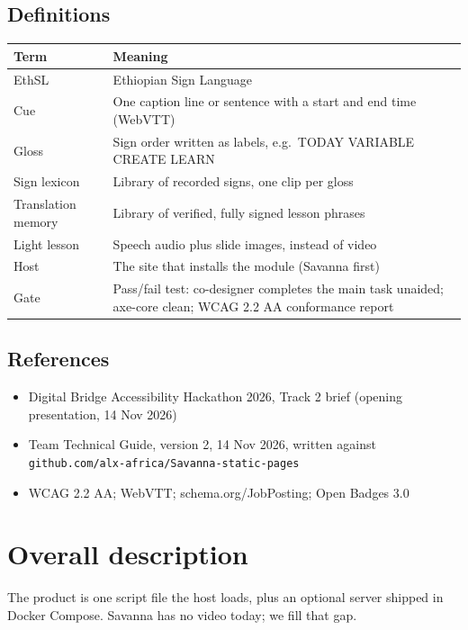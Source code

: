 \documentclass[11pt,a4paper]{article}
\newcommand{\code}[1]{\texttt{#1}}
\begin{document}
\subsection{Definitions}
\begin{xltabular}{\textwidth}{@{}l X@{}}
\toprule
\textbf{Term} & \textbf{Meaning} \\
\midrule
\endhead
EthSL & Ethiopian Sign Language \\
Cue & One caption line or sentence with a start and end time (WebVTT) \\
Gloss & Sign order written as labels, e.g.\ TODAY VARIABLE CREATE LEARN \\
Sign lexicon & Library of recorded signs, one clip per gloss \\
Translation memory & Library of verified, fully signed lesson phrases \\
Light lesson & Speech audio plus slide images, instead of video \\
Host & The site that installs the module (Savanna first) \\
Gate & Pass/fail test: co-designer completes the main task unaided; axe-core clean; WCAG 2.2 AA conformance report \\
\bottomrule
\end{xltabular}

\subsection{References}
\begin{itemize}
  \item Digital Bridge Accessibility Hackathon 2026, Track 2 brief (opening presentation, 14 Nov 2026)
  \item Team Technical Guide, version 2, 14 Nov 2026, written against \code{github.com/\allowbreak alx-africa/\allowbreak Savanna-static-pages}
  \item WCAG 2.2 AA; WebVTT; schema.org/JobPosting; Open Badges 3.0
\end{itemize}

\section{Overall description}

The product is one script file the host loads, plus an optional server shipped in Docker Compose. Savanna has no video today; we fill that gap.
\end{document}
